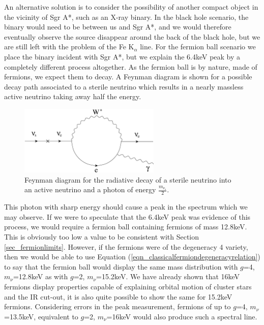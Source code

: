 An alternative solution is to consider the possibility of another compact object in the vicinity of Sgr A*, such as an X-ray binary.
In the
black hole scenario, the binary would need to be between us and Sgr A*, and we would therefore eventually observe the source disappear around
the back of the black hole, but we are still left with the problem of the Fe K$_\alpha$ line. For the fermion ball scenario we place
the binary incident with Sgr A*, but we explain the 6.4keV peak by a completely different process altogether. As the fermion ball is by
nature, made of fermions, we expect them to decay. A Feynman diagram is shown for a possible decay path associated to a sterile neutrino which
results in a nearly massless active neutrino taking away half the energy.
\begin{figure}[!h]
	\begin{center}
	\includegraphics[angle=0,width=0.6\textwidth]{eps/fermiondecay.eps}
	\caption{Feynman diagram for the radiative decay of a sterile neutrino into an active neutrino
	and a photon of energy $\frac{m_{\nu_s}}{2}$.}
	\label{fig_feynmandiag}
	\end{center}
\end{figure}

\noindent
This photon with sharp energy should cause a peak in the spectrum which we may
observe. If we were to speculate that the 6.4keV peak was evidence of this process, we would require a fermion ball containing fermions of
mass 12.8keV. This is obviously too low a value to be consistent with Section \ref{sec_fermionlimits}. However, if the fermions were of the
degeneracy 4 variety, then we would be able to use Equation (\ref{eqn_classicalfermiondegeneracyrelation}) to say that the fermion ball would
display the same mass distribution with $g$=4, $m_\nu$=12.8keV as with $g$=2, $m_\nu$=15.2keV. We have already shown that 16keV
fermions display properties capable of explaining orbital motion of cluster stars and the IR cut-out, it is also quite possible to
show the same for 15.2keV fermions. Considering errors in the peak measurement, fermions of up to $g$=4, $m_\nu$=13.5keV,
equivalent to $g$=2, $m_\nu$=16keV would also produce such a spectral line.

